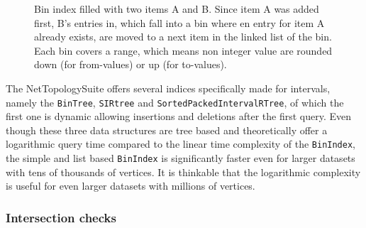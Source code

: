 \begin{figure}[h]
\begin{figcenter}
					\end{figcenter}
					\caption{Bin index filled with two items A and B. Since item A was added first, B's entries in, which fall into a bin where en entry for item A already exists, are moved to a next item in the linked list of the bin. Each bin covers a range, which means non integer value are rounded down (for from-values) or up (for to-values).}
					\label{fig:bin-index}
				\end{figure}
				
				The NetTopologySuite offers several indices specifically made for intervals, namely the \texttt{BinTree}, \texttt{SIRtree} and \texttt{SortedPackedIntervalRTree}, of which the first one is dynamic allowing insertions and deletions after the first query.
				Even though these three data structures are tree based and theoretically offer a logarithmic query time compared to the linear time complexity of the \texttt{BinIndex}, the simple and list based \texttt{BinIndex} is significantly faster even for larger datasets with tens of thousands of vertices.
				It is thinkable that the logarithmic complexity is useful for even larger datasets with millions of vertices.
			
			\subsubsection{Intersection checks}
			\label{subsubsec:intersection-checks}
			
